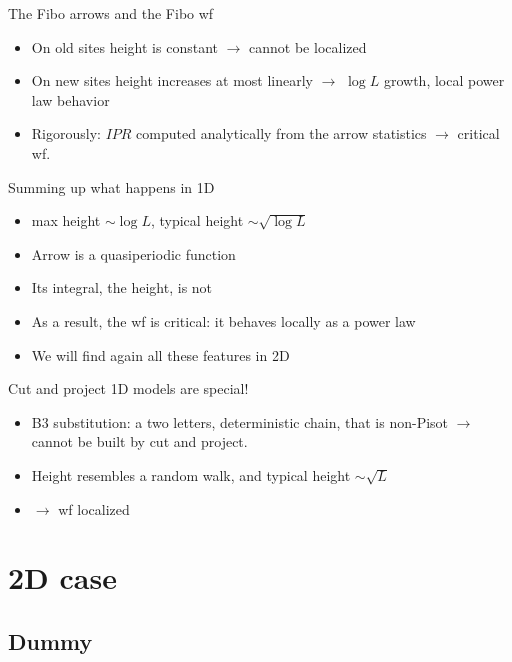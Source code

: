 \documentclass[xcolor=x11names,compress,professionalfonts]{beamer}
\renewcommand{\(}{\begin{columns}}
\renewcommand{\)}{\end{columns}}
\newcommand{\<}[1]{\begin{column}{#1}}
\renewcommand{\>}{\end{column}}
\begin{document}
\begin{frame}{The Fibo arrows and the Fibo wf}
\begin{itemize}
	\item On old sites height is constant $\rightarrow$ cannot be localized
	\item On new sites height increases at most linearly $\rightarrow$ $\log L$ growth, local power law behavior
	\item Rigorously: $IPR$ computed analytically from the arrow statistics $\rightarrow$ critical wf.
\end{itemize}
\end{frame}

\begin{frame}{Summing up what happens in 1D}
\begin{itemize}
	\item max height $\sim \log L$, typical height $\sim \sqrt{\log L}$
	\item Arrow is a quasiperiodic function
	\item Its integral, the height, is not
	\item As a result, the wf is critical: it behaves locally as a power law
	\item We will find again all these features in 2D
\end{itemize}
\end{frame}

\begin{frame}{Cut and project 1D models are special!}
\begin{itemize}
	\item B3 substitution: a two letters, deterministic chain, that is non-Pisot $\rightarrow$ cannot be built by cut and project.
	\item Height resembles a random walk, and typical height $\sim \sqrt{L}$
	\item $\rightarrow$ wf localized 
\end{itemize}
\end{frame}

\section{2D case}
\subsection{Dummy}
\end{document}
